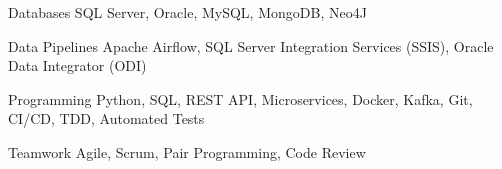 


\begin{cvskills}


\cvskill
{Databases} %
{SQL Server, Oracle, MySQL, MongoDB, Neo4J} %

\cvskill
{Data Pipelines} %
{Apache Airflow, SQL Server Integration Services (SSIS), Oracle Data Integrator (ODI)} %

\cvskill
{Programming} %
{Python, SQL, REST API, Microservices, Docker, Kafka, Git, CI/CD, TDD, Automated Tests} %


\cvskill
{Teamwork} %
{Agile, Scrum, Pair Programming, Code Review} %


\end{cvskills}